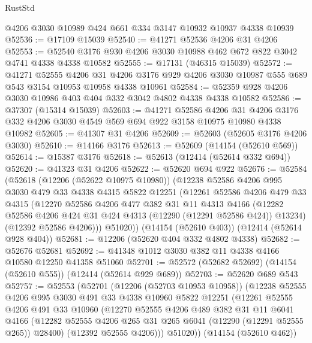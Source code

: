 \begin{lexlean}{RustStd}
\begin{coremodule}
{\begin{coremodule}
{{{{{{{{{{{{{{{{{{{{{{{{{{{{{{{{{{{{{{{{{{{{{{{{{{    @4206
    @3030
    @10989
    @424
    @661
    @334
    @3147
    @10932
    @10937
    @4338
    @10939
@52536 := @17109 @15039
@52540 := @41271 @52536 @4206 @31 @4206
@52553 := @52540 @3176 @930 @4206 @3030 @10988 @462 @672 @822 @3042 @4741 @4338 @4338 @10582
@52555 := @17131 (@46315 @15039)
@52572 := @41271
    @52555
    @4206
    @31
    @4206
    @3176
    @929
    @4206
    @3030
    @10987
    @555
    @689
    @543
    @3154
    @10953
    @10958
    @4338
    @10961
@52584 := @52359 @928 @4206 @3030 @10986 @403 @404 @332 @3042 @4802 @4338 @4338 @10582
@52586 := @37307 (@15314 @15039)
@52603 := @41271
    @52586
    @4206
    @31
    @4206
    @3176
    @332
    @4206
    @3030
    @4549
    @569
    @694
    @922
    @3158
    @10975
    @10980
    @4338
    @10982
@52605 := @41307 @31 @4206
@52609 := @52603 (@52605 @3176 @4206 @3030)
@52610 := @14166 @3176
@52613 := @52609 (@14154 (@52610 @569))
@52614 := @15387 @3176
@52618 := @52613 (@12414 (@52614 @332 @694))
@52620 := @41323 @31 @4206
@52622 := @52620 @694 @922
@52676 := @52584
    (@52618
      (@12206 (@52622 @10975 @10980))
      (@12238
        @52586
        @4206
        @995
        @3030
        @479
        @33
        @4338
        @4315
        @5822
        @12251
        (@12261
          @52586
          @4206
          @479
          @33
          @4315
          (@12270
            @52586
            @4206
            @477
            @382
            @31
            @11
            @4313
            @4166
            (@12282 @52586 @4206 @424 @31 @424 @4313 (@12290 (@12291 @52586 @424)) @13234)
            (@12392 @52586 @4206)))
        @51020))
    (@14154 (@52610 @403))
    (@12414 (@52614 @928 @404))
@52681 := @12206 (@52620 @404 @332 @4802 @4338)
@52682 := @52676 @52681
@52692 := @41348 @1012 @3030 @382 @11 @4338 @4166 @10580 @12250 @41358 @51060
@52701 := @52572 (@52682 @52692) (@14154 (@52610 @555)) (@12414 (@52614 @929 @689))
@52703 := @52620 @689 @543
@52757 := @52553
    (@52701
      (@12206 (@52703 @10953 @10958))
      (@12238
        @52555
        @4206
        @995
        @3030
        @491
        @33
        @4338
        @10960
        @5822
        @12251
        (@12261
          @52555
          @4206
          @491
          @33
          @10960
          (@12270
            @52555
            @4206
            @489
            @382
            @31
            @11
            @6041
            @4166
            (@12282 @52555 @4206 @265 @31 @265 @6041 (@12290 (@12291 @52555 @265)) @28400)
            (@12392 @52555 @4206)))
        @51020))
    (@14154 (@52610 @462))
}}}}}}}}}}}}}}}}}}}}}}}}}}}}}}}}}}}}}}}}}}}}}}}}}}
\end{coremodule}}
\end{coremodule}
\end{lexlean}
